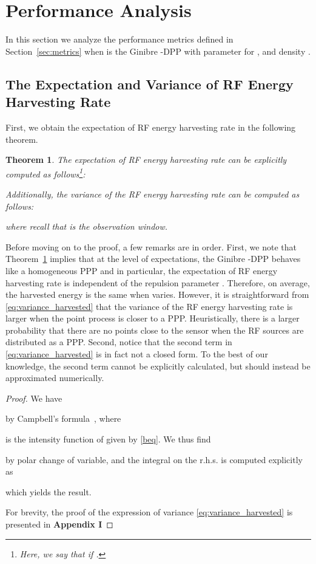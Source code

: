 \documentclass[12pt,draftclsnofoot,onecolumn]{IEEEtran}
\newtheorem{theorem}{Theorem}
\begin{document}
\section{Performance Analysis}
\label{sec:Analysis}

In this section we analyze the performance metrics defined in Section~\ref{sec:metrics} when  is the Ginibre -DPP with parameter  for , and density . 


\subsection{The Expectation and Variance of RF Energy Harvesting Rate}

First, we obtain the expectation of RF energy harvesting rate in the following theorem.
\begin{theorem}
\label{thm:expectedharvestedenergy}
The expectation of RF energy harvesting rate can be explicitly computed as follows\footnote{Here, we say that  if .}:

Additionally, the variance of the RF energy harvesting rate can be computed as follows:

where recall that  is the observation window.
\end{theorem}



Before moving on to the proof, a few remarks are in order. First, we note that Theorem~\ref{thm:expectedharvestedenergy} implies that at the level of expectations, the Ginibre -DPP behaves like a homogeneous PPP and in particular, the expectation of RF energy harvesting rate is independent of the repulsion parameter . Therefore, on average, the harvested energy is the same when  varies. However, it is straightforward from \eqref{eq:variance_harvested} that the variance of the RF energy harvesting rate is larger when the point process is closer to a PPP. Heuristically, there is a larger probability that there are no points close to the sensor when the RF sources are distributed as a PPP. 
Second, notice that the second term in \eqref{eq:variance_harvested} is in fact not a closed form. To the best of our knowledge, the second term cannot be explicitly calculated, but should instead be approximated numerically.
\begin{proof}
We have

by Campbell's formula~\cite{Kallenberg}, where 
 
 is the intensity function of  given by \eqref{beq}.
We thus find

 by polar change of variable,
 and the integral on the r.h.s. is computed explicitly as

which yields the result.

For brevity, the proof of the expression of variance \eqref{eq:variance_harvested} is presented in {\bf Appendix I}
\end{proof}
\end{document}
